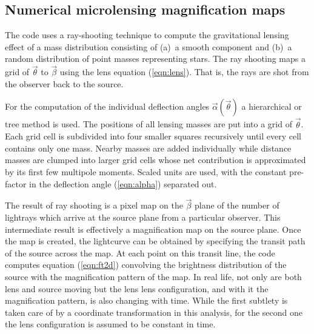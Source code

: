 \documentclass[usenatbib]{mn2e}
\begin{document}
\subsection{Numerical microlensing magnification maps}

The code uses a ray-shooting technique to compute the gravitational
lensing effect of a mass distribution consisting of (a)~a smooth
component and (b)~a random distribution of point masses representing
stars.  The ray shooting maps a grid of $\vec\theta$ to $\vec\beta$
using the lens equation (\ref{eqn:lens}).  That is, the rays are shot
from the observer back to the source.

For the computation of the individual deflection angles
$\vec\alpha(\vec\theta)$ a hierarchical or tree method is used.  The
positions of all lensing masses are put into a grid of $\vec\theta$.
Each grid cell is subdivided into four smaller squares recursively
until every cell contains only one mass.  Nearby masses are added
individually while distance masses are clumped into larger grid cells
whose net contribution is approximated by its first few multipole
moments.  Scaled units are used, with the constant pre-factor in the
deflection angle (\ref{eqn:alpha}) separated out.

The result of ray shooting is a pixel map on the $\vec\beta$ plane of
the number of lightrays which arrive at the source plane from a
particular observer.  This intermediate result is effectively a
magnification map on the source plane.  Once the map is created, the
lightcurve can be obtained by specifying the transit path of the
source across the map.  At each point on this transit line, the code
computes equation (\ref{eqn:ft2d}) convolving the brightness
distribution of the source with the magnification pattern of the map.
In real life, not only are both lens and source moving but the lens
lens configuration, and with it the magnification pattern, is also
changing with time.  While the first subtlety is taken care of by a
coordinate transformation in this analysis, for the second one the
lens configuration is assumed to be constant in time.
\end{document}
